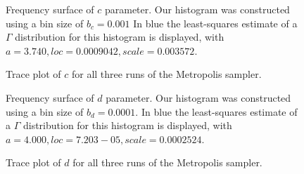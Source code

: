\begin{figure}[t]
    \centering{}
    \caption{Frequency surface of $c$ parameter.
    Our histogram was constructed using a bin size of $b_c = 0.001$
    In blue the least-squares estimate of a $\Gamma$ distribution for this histogram is displayed,
    with $a=3.740, \mathit{loc}=0.0009042, \mathit{scale}=0.003572$.
    }\label{fig:cData}
\end{figure}
\begin{figure}[t]
    \centering{}
    \caption{Trace plot of $c$ for all three runs of the Metropolis sampler.
    }\label{fig:cTrace}
\end{figure}

\begin{figure}[t]
    \centering{}
    \caption{Frequency surface of $d$ parameter.
    Our histogram was constructed using a bin size of $b_d = 0.0001$.
    In blue the least-squares estimate of a $\Gamma$ distribution for this histogram is displayed,
    with $a=4.000, \mathit{loc}=7.203-05, \mathit{scale}=0.0002524$.
    }\label{fig:dData}
\end{figure}
\begin{figure}[t]
    \centering{}
    \caption{Trace plot of $d$ for all three runs of the Metropolis sampler.
    }\label{fig:dTrace}
\end{figure}

